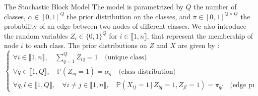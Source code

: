 \documentclass[final]{beamer}
\newlength{\colwidth}
\begin{document}
\begin{frame}[t]
\begin{columns}[t]
\begin{column}{\colwidth}
\begin{block}{The Stochastic Block Model}
        The model is parametrized by $Q$ the number of classes, $\alpha\in [0,1]^Q$ the prior distribution on the classes, and $\pi\in [0,1]^{Q\times Q}$ the probability of an edge between two nodes of different classes. We also introduce the random variables $Z_i\in \{0,1\}^Q$ for $i\in \llbracket 1,n \rrbracket$, that represent the membership of node $i$ to each class. The prior distributions on $Z$ and $X$ are given by :
        \begin{equation*}
          \begin{cases}
            \forall i\in \llbracket 1,n \rrbracket, \quad \sum_{q=1}^Q Z_{iq} = 1 \quad\text{(unique class)}            \\
            \forall q\in \llbracket 1,Q \rrbracket,\quad \mathbb{P}(Z_{iq}=1)=\alpha_q \quad\text{(class distribution)} \\
            \forall q,l\in \llbracket 1,Q \rrbracket, \quad \forall i\neq j\in \llbracket 1,n \rrbracket, \quad \mathbb{P}(X_{ij}=1\,|\,Z_{iq}=1,Z_{jl}=1)=\pi_{ql} \quad\text{(edge probability)}
          \end{cases}
        \end{equation*}
      \end{block}


\end{column}
\end{columns}
\end{frame}
\end{document}
